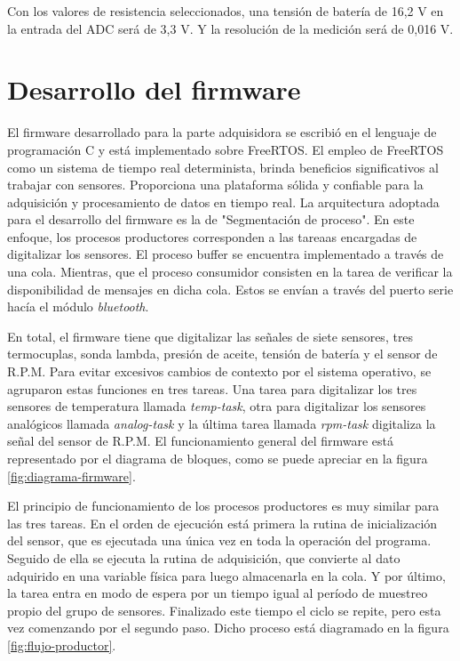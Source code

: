 Con los valores de resistencia seleccionados, una tensión de batería de 16,2 V en la entrada del ADC será de 3,3 V. Y la resolución de la medición será de 0,016 V.

\break

\section{Desarrollo del firmware}

El firmware desarrollado para la parte adquisidora se escribió en el lenguaje de programación C y está implementado sobre FreeRTOS. El empleo de FreeRTOS como un sistema de tiempo real determinista, brinda beneficios significativos al trabajar con sensores. Proporciona una plataforma sólida y confiable para la adquisición y procesamiento de datos en tiempo real. La arquitectura adoptada para el desarrollo del firmware es la de "Segmentación de proceso". En este enfoque, los procesos productores corresponden a las tareaas encargadas de digitalizar los sensores. El proceso buffer se encuentra implementado a través de una cola. Mientras, que el proceso consumidor consisten en la tarea de verificar la disponibilidad de mensajes en dicha cola. Estos se envían a través del puerto serie hacía el módulo \textit{bluetooth}.

En total, el firmware tiene que digitalizar las señales de siete sensores, tres termocuplas, sonda lambda, presión de aceite, tensión de batería y el sensor de R.P.M. Para evitar excesivos cambios de contexto por el sistema operativo, se agruparon estas funciones en tres tareas. Una tarea para digitalizar los tres sensores de temperatura llamada \textit{temp-task}, otra para digitalizar los sensores analógicos llamada \textit{analog-task} y la última tarea llamada \textit{rpm-task} digitaliza la señal del sensor de R.P.M. El funcionamiento general del firmware está representado por el diagrama de bloques, como se puede apreciar en la figura \ref{fig:diagrama-firmware}.

El principio de funcionamiento de los procesos productores es muy similar para las tres tareas. En el orden de ejecución está primera la rutina de inicialización del sensor, que es ejecutada una única vez en toda la operación del programa. Seguido de ella se ejecuta la rutina de adquisición, que convierte al dato adquirido en una variable física para luego almacenarla en la cola. Y por último, la tarea entra en modo de espera por un tiempo igual al período de muestreo propio del grupo de sensores. Finalizado este tiempo el ciclo se repite, pero esta vez comenzando por el segundo paso. Dicho proceso está diagramado en la figura \ref{fig:flujo-productor}.

